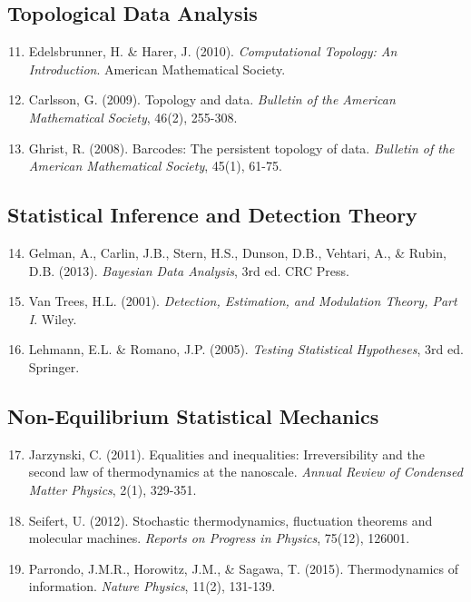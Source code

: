 \documentclass[12pt,a4paper]{article}
\theoremstyle{definition}
\theoremstyle{remark}
\begin{document}
\subsection*{Topological Data Analysis}

\begin{enumerate}
    \setcounter{enumi}{10}
    \item Edelsbrunner, H. \& Harer, J. (2010). \textit{Computational Topology: An Introduction}. American Mathematical Society.
    
    \item Carlsson, G. (2009). Topology and data. \textit{Bulletin of the American Mathematical Society}, 46(2), 255-308.
    
    \item Ghrist, R. (2008). Barcodes: The persistent topology of data. \textit{Bulletin of the American Mathematical Society}, 45(1), 61-75.
\end{enumerate}

\subsection*{Statistical Inference and Detection Theory}

\begin{enumerate}
    \setcounter{enumi}{13}
    \item Gelman, A., Carlin, J.B., Stern, H.S., Dunson, D.B., Vehtari, A., \& Rubin, D.B. (2013). \textit{Bayesian Data Analysis}, 3rd ed. CRC Press.
    
    \item Van Trees, H.L. (2001). \textit{Detection, Estimation, and Modulation Theory, Part I}. Wiley.
    
    \item Lehmann, E.L. \& Romano, J.P. (2005). \textit{Testing Statistical Hypotheses}, 3rd ed. Springer.
\end{enumerate}

\subsection*{Non-Equilibrium Statistical Mechanics}

\begin{enumerate}
    \setcounter{enumi}{16}
    \item Jarzynski, C. (2011). Equalities and inequalities: Irreversibility and the second law of thermodynamics at the nanoscale. \textit{Annual Review of Condensed Matter Physics}, 2(1), 329-351.
    
    \item Seifert, U. (2012). Stochastic thermodynamics, fluctuation theorems and molecular machines. \textit{Reports on Progress in Physics}, 75(12), 126001.
    
    \item Parrondo, J.M.R., Horowitz, J.M., \& Sagawa, T. (2015). Thermodynamics of information. \textit{Nature Physics}, 11(2), 131-139.
\end{enumerate}
\end{document}
